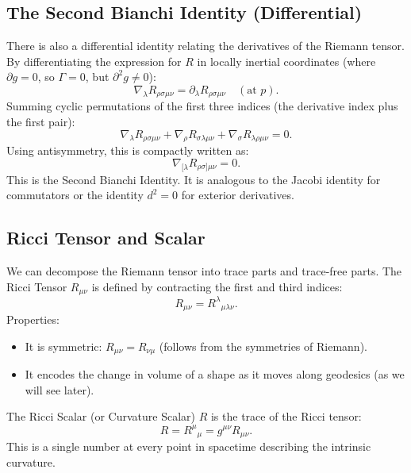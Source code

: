 \documentclass[11pt, a4paper]{report}
\begin{document}
\subsection*{The Second Bianchi Identity (Differential)}
There is also a differential identity relating the derivatives of the Riemann tensor. By differentiating the expression for \(R\) in locally inertial coordinates (where \(\partial g=0\), so \(\Gamma=0\), but \(\partial^2 g \neq 0\)):
\begin{equation}
\nabla_\lambda R_{\rho\sigma\mu\nu} = \partial_\lambda R_{\rho\sigma\mu\nu} \quad (\text{at } p).
\end{equation}
Summing cyclic permutations of the first three indices (the derivative index plus the first pair):
\begin{equation}
\nabla_\lambda R_{\rho\sigma\mu\nu} + \nabla_\rho R_{\sigma\lambda\mu\nu} + \nabla_\sigma R_{\lambda\rho\mu\nu} = 0.
\end{equation}
Using antisymmetry, this is compactly written as:
\begin{equation}
\nabla_{[\lambda} R_{\rho\sigma]\mu\nu} = 0.
\end{equation}
This is the Second Bianchi Identity. It is analogous to the Jacobi identity for commutators or the identity \(d^2 = 0\) for exterior derivatives.

\subsection*{Ricci Tensor and Scalar}
We can decompose the Riemann tensor into trace parts and trace-free parts.
The Ricci Tensor \(R_{\mu\nu}\) is defined by contracting the first and third indices:
\begin{equation}
R_{\mu\nu} = {R^\lambda}_{\mu\lambda\nu}.
\end{equation}
Properties:
\begin{itemize}
    \item It is symmetric: \(R_{\mu\nu} = R_{\nu\mu}\) (follows from the symmetries of Riemann).
    \item It encodes the change in volume of a shape as it moves along geodesics (as we will see later).
\end{itemize}

The Ricci Scalar (or Curvature Scalar) \(R\) is the trace of the Ricci tensor:
\begin{equation}
R = {R^\mu}_\mu = g^{\mu\nu} R_{\mu\nu}.
\end{equation}
This is a single number at every point in spacetime describing the intrinsic curvature.
\end{document}
